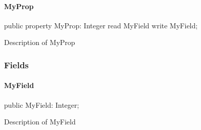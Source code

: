 \documentclass{report}
\begin{document}
\paragraph*{MyProp}\hspace*{\fill}

\begin{list}{}{
\setlength{\itemindent}{0cm}
\setlength{\listparindent}{0cm}
\setlength{\leftmargin}{\evensidemargin}
\addtolength{\leftmargin}{\tmplength}
\settowidth{\labelsep}{X}
\addtolength{\leftmargin}{\labelsep}
\setlength{\labelwidth}{\tmplength}
}
\begin{flushleft}
\item[\textbf{Declaration}\hfill]
\begin{ttfamily}
public property MyProp: Integer read MyField write MyField;\end{ttfamily}


\end{flushleft}
\par
\item[\textbf{Description}]
Description of MyProp

\end{list}
\subsubsection*{\large{\textbf{Fields}}\normalsize\hspace{1ex}\hfill}
\paragraph*{MyField}\hspace*{\fill}

\begin{list}{}{
\setlength{\itemindent}{0cm}
\setlength{\listparindent}{0cm}
\setlength{\leftmargin}{\evensidemargin}
\addtolength{\leftmargin}{\tmplength}
\settowidth{\labelsep}{X}
\addtolength{\leftmargin}{\labelsep}
\setlength{\labelwidth}{\tmplength}
}
\begin{flushleft}
\item[\textbf{Declaration}\hfill]
\begin{ttfamily}
public MyField: Integer;\end{ttfamily}


\end{flushleft}
\par
\item[\textbf{Description}]
Description of MyField

\end{list}
\end{document}
